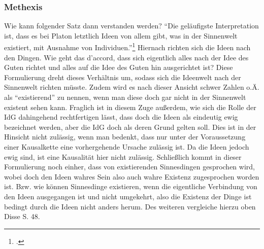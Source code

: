 \subsubsection{Methexis}
Wie kann folgender Satz dann verstanden werden? \enquote{Die geläufigste Interpretation ist, dass es bei Platon letztlich Ideen von allem gibt, was in der Sinnenwelt existiert, mit Ausnahme von Individuen.}\footcite[][S. 31]{DisseMetaphysik} 
Hiernach richten sich die Ideen nach den Dingen. Wie geht das d'accord, dass sich eigentlich alles nach der Idee des Guten richtet und alles auf die Idee des Guten hin ausgerichtet ist? Diese Formulierung dreht dieses Verhältnis um, sodass sich die Ideenwelt nach der Sinnenwelt richten müsste. Zudem wird es nach dieser Ansicht schwer Zahlen o.Ä. als \enquote{existierend} zu nennen, wenn man diese doch gar nicht in der Sinnenwelt existent sehen kann. 
Fraglich ist in diesem Zuge außerdem, wie sich die Rolle der IdG dahingehend rechtfertigen lässt, dass doch die Ideen als eindeutig ewig bezeichnet werden, aber die IdG doch als deren Grund gelten soll. Dies ist in der Hinsicht nicht zulässig, wenn man bedenkt, dass nur unter der Voraussetzung einer Kausalkette eine vorhergehende Ursache zulässig ist. Da die Ideen jedoch ewig sind, ist eine Kausalität hier nicht zulässig.
Schließlich kommt in dieser Formulierung noch einher, dass von existierenden Sinnesdingen gesprochen wird, wobei doch den Ideen wahres Sein also auch wahre Existenz zugesprochen worden ist. Bzw. wie können Sinnesdinge existieren, wenn die eigentliche Verbindung von den Ideen ausgegangen ist und nicht umgekehrt, also die Existenz der Dinge ist bedingt durch die Ideen nicht anders herum.
Des weiteren vergleiche hierzu oben Disse S. 48.


